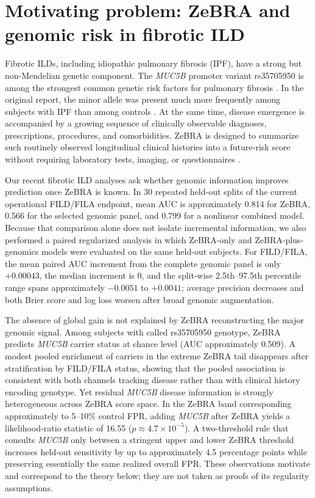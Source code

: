 \documentclass[journal]{IEEEtran}
\begin{document}
\section{Motivating problem: ZeBRA and genomic risk in fibrotic ILD}

Fibrotic ILDs, including idiopathic pulmonary fibrosis (IPF), have a strong but non-Mendelian genetic component. The \textit{MUC5B} promoter variant rs35705950 is among the strongest common genetic risk factors for pulmonary fibrosis \cite{Seibold2011,Fingerlin2013,Allen2020}. In the original report, the minor allele was present much more frequently among subjects with IPF than among controls \cite{Seibold2011}. At the same time, disease emergence is accompanied by a growing sequence of clinically observable diagnoses, prescriptions, procedures, and comorbidities. ZeBRA is designed to summarize such routinely observed longitudinal clinical histories into a future-risk score without requiring laboratory tests, imaging, or questionnaires \cite{Onishchenko2026}.

Our recent fibrotic ILD analyses ask whether genomic information improves prediction once ZeBRA is known. In 30 repeated held-out splits of the current operational FILD/FILA endpoint, mean AUC is approximately 0.814 for ZeBRA, 0.566 for the selected genomic panel, and 0.799 for a nonlinear combined model. Because that comparison alone does not isolate incremental information, we also performed a paired regularized analysis in which ZeBRA-only and ZeBRA-plus-genomics models were evaluated on the same held-out subjects. For FILD/FILA, the mean paired AUC increment from the complete genomic panel is only $+0.00043$, the median increment is 0, and the split-wise 2.5th--97.5th percentile range spans approximately $-0.0051$ to $+0.0041$; average precision decreases and both Brier score and log loss worsen after broad genomic augmentation.

The absence of global gain is not explained by ZeBRA reconstructing the major genomic signal. Among subjects with called rs35705950 genotype, ZeBRA predicts \textit{MUC5B} carrier status at chance level (AUC approximately 0.509). A modest pooled enrichment of carriers in the extreme ZeBRA tail disappears after stratification by FILD/FILA status, showing that the pooled association is consistent with both channels tracking disease rather than with clinical history encoding genotype. Yet residual \textit{MUC5B} disease information is strongly heterogeneous across ZeBRA score space. In the ZeBRA band corresponding approximately to 5--10\% control FPR, adding \textit{MUC5B} after ZeBRA yields a likelihood-ratio statistic of 16.55 ($p\approx4.7\times10^{-5}$). A two-threshold rule that consults \textit{MUC5B} only between a stringent upper and lower ZeBRA threshold increases held-out sensitivity by up to approximately 4.5 percentage points while preserving essentially the same realized overall FPR. These observations motivate and correspond to the theory below; they are not taken as proofs of its regularity assumptions.
\end{document}
